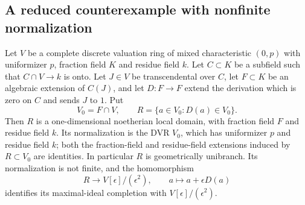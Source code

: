 \subsection{A reduced counterexample with nonfinite normalization}

\begin{lemma}
\label{lem:C-RD11-ring}
Let $V$ be a complete discrete valuation ring of mixed characteristic
$(0,p)$ with uniformizer $p$, fraction field $K$ and residue field $k$.
Let $C\subset K$ be a subfield such that $C\cap V\to k$ is onto.
Let $J\in V$ be transcendental over $C$, let $F\subset K$ be an
algebraic extension of $C(J)$, and let $D:F\to F$ extend the derivation
which is zero on $C$ and sends $J$ to $1$. Put
\[
 V_0=F\cap V,\qquad R=\{a\in V_0:D(a)\in V_0\}.
\]
Then $R$ is a one-dimensional noetherian local domain, with fraction
field $F$ and residue field $k$. Its normalization is the DVR $V_0$,
which has uniformizer $p$ and residue field $k$; both the fraction-field
and residue-field extensions induced by $R\subset V_0$ are identities.
In particular $R$ is geometrically unibranch. Its normalization is not
finite, and the homomorphism
\[
 R\longrightarrow V[\epsilon]/(\epsilon^2),
 \qquad a\longmapsto a+\epsilon D(a)
                                                        \tag{C-RD11.1}
\]
identifies its maximal-ideal completion with
$V[\epsilon]/(\epsilon^2)$.
\end{lemma}
